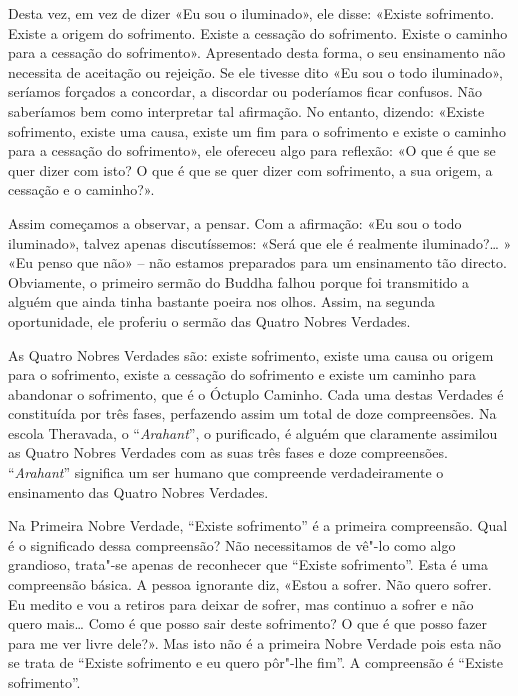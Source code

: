 Desta vez, em vez de dizer «Eu sou o iluminado», ele disse: «Existe sofrimento.
Existe a origem do sofrimento. Existe a cessação do sofrimento. Existe o caminho
para a cessação do sofrimento». Apresentado desta forma, o seu ensinamento não
necessita de aceitação ou rejeição. Se ele tivesse dito «Eu sou o todo
iluminado», seríamos forçados a concordar, a discordar ou poderíamos ficar confusos.
Não saberíamos bem como interpretar tal afirmação. No entanto, dizendo: «Existe
sofrimento, existe uma causa, existe um fim para o sofrimento e existe o caminho
para a cessação do sofrimento», ele ofereceu algo para reflexão: «O que é que se
quer dizer com isto? O que é que se quer dizer com sofrimento, a sua origem, a
cessação e o caminho?».

\enlargethispage{\baselineskip}

Assim começamos a observar, a pensar. Com a afirmação: «Eu sou o todo
iluminado», talvez apenas discutíssemos: «Será que ele é realmente
iluminado?\ldots{} » «Eu penso que não» – não estamos preparados para um ensinamento
tão directo. Obviamente, o primeiro sermão do Buddha falhou porque foi
transmitido a alguém que ainda tinha bastante poeira nos olhos. Assim, na
segunda oportunidade, ele proferiu o sermão das Quatro Nobres Verdades.

\sectionBreak

As Quatro Nobres Verdades são: existe sofrimento, existe uma causa ou origem
para o sofrimento, existe a cessação do sofrimento e existe um caminho para
abandonar o sofrimento, que é o Óctuplo Caminho. Cada uma destas Verdades é
constituída por três fases, perfazendo assim um total de doze compreensões. Na
escola Theravada, o “\emph{Arahant}”, o purificado, é alguém que claramente
assimilou as Quatro Nobres Verdades com as suas três fases e doze compreensões.
“\emph{Arahant}” significa um ser humano que compreende verdadeiramente o
ensinamento das Quatro Nobres Verdades.

Na Primeira Nobre Verdade, “Existe sofrimento” é a primeira compreensão. Qual é o
significado dessa compreensão? Não necessitamos de vê"-lo como algo grandioso,
trata"-se apenas de reconhecer que “Existe sofrimento”. Esta é uma compreensão
básica. A pessoa ignorante diz, «Estou a sofrer. Não quero sofrer. Eu medito e
vou a retiros para deixar de sofrer, mas continuo a sofrer e não quero
mais\ldots{} Como é que posso sair deste sofrimento? O que é que posso fazer
para me ver livre dele?». Mas isto não é a primeira Nobre Verdade pois esta não
se trata de “Existe sofrimento e eu quero pôr"-lhe fim”. A compreensão é “Existe
sofrimento”.

